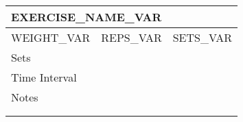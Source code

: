 
{\setlength{\extrarowheight}{10pt}%
    \begin{tabularx}{\textwidth}{|X|X|X|}
        \hline
        \multicolumn{3}{|X|}{EXERCISE\_NAME\_VAR} \\
        \hline
        WEIGHT\_VAR & REPS\_VAR & SETS\_VAR \\
        \hline
        Sets & \multicolumn{2}{|X|}{ } \\
        \hline
        Time Interval & \multicolumn{2}{|X|}{ } \\
        \hline
        Notes & \multicolumn{2}{c|}{} \\
              & \multicolumn{2}{c|}{} \\
              & \multicolumn{2}{c|}{} \\
        \hline
    \end{tabularx}}
